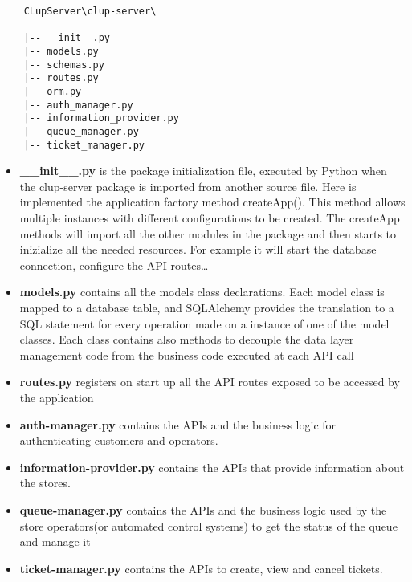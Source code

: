 \begin{lstlisting}
    CLupServer\clup-server\

    |-- __init__.py
    |-- models.py
    |-- schemas.py
    |-- routes.py
    |-- orm.py
    |-- auth_manager.py
    |-- information_provider.py
    |-- queue_manager.py
    |-- ticket_manager.py

\end{lstlisting}

\begin{itemize}
    \item \textbf{\_\_init\_\_.py} is the package initialization file, executed by Python when the clup-server package is imported from another source file. Here is implemented the application factory method createApp(). This method allows multiple instances with different configurations to be created. The createApp methods will import all the other modules in the package and then starts to inizialize all the needed resources. For example it will start the database connection, configure the API routes\ldots
    \item \textbf{models.py} contains all the models class declarations. Each model class is mapped to a database table, and SQLAlchemy provides the translation to a SQL statement for every operation made on a instance of one of the model classes. Each class contains also methods to decouple the data layer management code from the business code executed at each API call
    \item \textbf{routes.py} registers on start up all the API routes exposed to be accessed by the application
    \item \textbf{auth-manager.py} contains the APIs and the business logic for authenticating customers and operators.
    \item \textbf{information-provider.py} contains the APIs that provide information about the stores.
    \item \textbf{queue-manager.py} contains the APIs and the business logic used by the store operators(or automated control systems) to get the status of the queue and manage it
    \item \textbf{ticket-manager.py} contains the APIs to create, view and cancel tickets.
\end{itemize}
